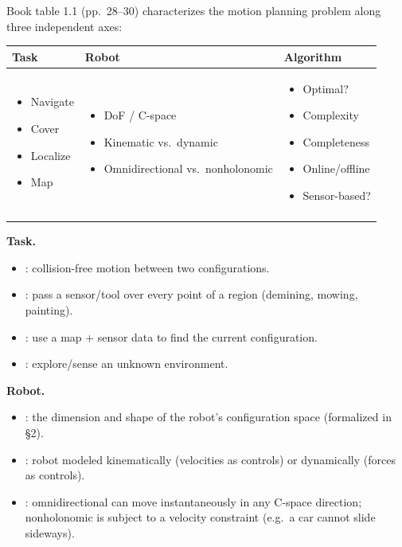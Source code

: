 Book table 1.1 (pp.\ 28--30) characterizes the motion planning problem along three independent axes:

\begin{center}\small
\renewcommand{\arraystretch}{1.15}
\setlength{\tabcolsep}{4pt}
\begin{tabular}{@{}p{2.1cm}p{3.0cm}p{2.6cm}@{}}
\toprule
\textbf{Task} & \textbf{Robot} & \textbf{Algorithm} \\
\midrule
\begin{itemize}[leftmargin=1em,itemsep=2pt,topsep=2pt]
\item Navigate
\item Cover
\item Localize
\item Map
\end{itemize}
&
\begin{itemize}[leftmargin=1em,itemsep=2pt,topsep=2pt]
\item DoF / C-space
\item Kinematic vs.\ dynamic
\item Omnidirectional vs.\ nonholonomic
\end{itemize}
&
\begin{itemize}[leftmargin=1em,itemsep=2pt,topsep=2pt]
\item Optimal?
\item Complexity
\item Completeness
\item Online/offline
\item Sensor-based?
\end{itemize} \\ \\
\bottomrule
\end{tabular}
\end{center}

\textbf{Task.}
\begin{itemize}
\item {}: collision-free motion between two configurations.
\item {}: pass a sensor/tool over every point of a region (demining, mowing, painting).
\item {}: use a map + sensor data to find the current configuration.
\item {}: explore/sense an unknown environment.
\end{itemize}

\textbf{Robot.}
\begin{itemize}
\item {}: the dimension and shape of the robot's configuration space (formalized in \S2).
\item {}: robot modeled kinematically (velocities as controls) or dynamically (forces as controls).
\item {}: omnidirectional can move instantaneously in any C-space direction; nonholonomic is subject to a velocity constraint (e.g.\ a car cannot slide sideways).
\end{itemize}

